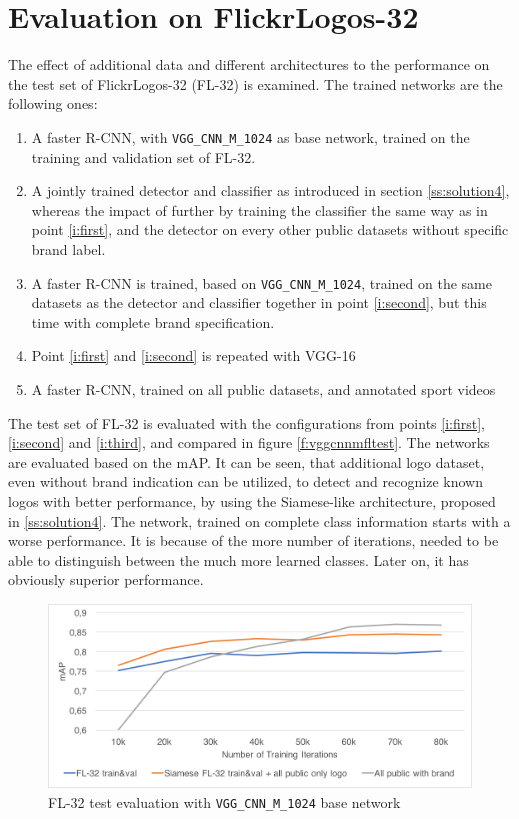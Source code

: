 \section{Evaluation on FlickrLogos-32}
The effect of additional data and different architectures to the performance on the test set of FlickrLogos-32 (FL-32) is examined. The trained networks are the following ones:
\begin{enumerate}
    \item\label{i:first} A faster R-CNN, with \texttt{VGG\_CNN\_M\_1024} as base network, trained on the training and validation set of FL-32.
    \item\label{i:second} A jointly trained detector and classifier as introduced in section \ref{ss:solution4}, whereas the impact of further by training the classifier the same way as in point \ref{i:first}, and the detector on every other public datasets without specific brand label.
    \item\label{i:third} A faster R-CNN is trained, based on \texttt{VGG\_CNN\_M\_1024}, trained on the same datasets as the detector and classifier together in point \ref{i:second}, but this time with complete brand specification.
    \item Point \ref{i:first} and \ref{i:second} is repeated with VGG-16
    \item A faster R-CNN, trained on all public datasets, and annotated sport videos
\end{enumerate}

The test set of FL-32 is evaluated with the configurations from points \ref{i:first}, \ref{i:second} and \ref{i:third}, and compared in figure \ref{f:vggcnnmfltest}. The networks are evaluated based on the mAP. It can be seen, that additional logo dataset, even without brand indication can be utilized, to detect and recognize known logos with better performance, by using the Siamese-like architecture, proposed in \ref{ss:solution4}. The network, trained on complete class information starts with a worse performance. It is because of the more number of iterations, needed to be able to distinguish between the much more learned classes. Later on, it has obviously superior performance.

\begin{figure}
  \centering
  \includegraphics[width=120mm]{images/mt/vggcnnmfltest.png}
  \caption{FL-32 test evaluation with \texttt{VGG\_CNN\_M\_1024} base network}
  \label{f:extreme}
\end{figure}

